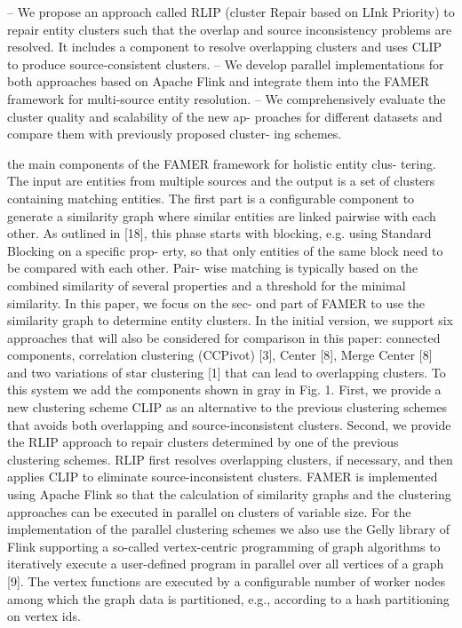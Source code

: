 \documentclass[runningheads]{llncs}
\begin{document}
– We propose an approach called RLIP (cluster Repair based on LInk Priority) to repair entity clusters such that the overlap and source inconsistency problems are resolved. It includes a component to resolve overlapping clusters and uses CLIP to produce source-consistent clusters.
– We develop parallel implementations for both approaches based on Apache Flink and integrate them into the FAMER framework for multi-source entity resolution.
– We comprehensively evaluate the cluster quality and scalability of the new ap- proaches for different datasets and compare them with previously proposed cluster- ing schemes.

 the main components of the FAMER framework for holistic entity clus- tering. The input are entities from multiple sources and the output is a set of clusters containing matching entities. The first part is a configurable component to generate a similarity graph where similar entities are linked pairwise with each other. As outlined in [18], this phase starts with blocking, e.g. using Standard Blocking on a specific prop- erty, so that only entities of the same block need to be compared with each other. Pair- wise matching is typically based on the combined similarity of several properties and a threshold for the minimal similarity. 
 In this paper, we focus on the sec- ond part of FAMER to use the similarity graph to determine entity clusters. In the initial version, we support six approaches that will also be considered for comparison in this paper: connected components, correlation clustering (CCPivot) [3], Center [8], Merge Center [8] and two variations of star clustering [1] that can lead to overlapping clusters.
 To this system we add the components shown in gray in Fig. 1. First, we provide a new clustering scheme CLIP as an alternative to the previous clustering schemes that avoids both overlapping and source-inconsistent clusters. Second, we provide the RLIP approach to repair clusters determined by one of the previous clustering schemes. RLIP first resolves overlapping clusters, if necessary, and then applies CLIP to eliminate source-inconsistent clusters.
FAMER is implemented using Apache Flink so that the calculation of similarity graphs and the clustering approaches can be executed in parallel on clusters of variable size. For the implementation of the parallel clustering schemes we also use the Gelly library of Flink supporting a so-called vertex-centric programming of graph algorithms to iteratively execute a user-defined program in parallel over all vertices of a graph [9]. The vertex functions are executed by a configurable number of worker nodes among which the graph data is partitioned, e.g., according to a hash partitioning on vertex ids.
\end{document}
